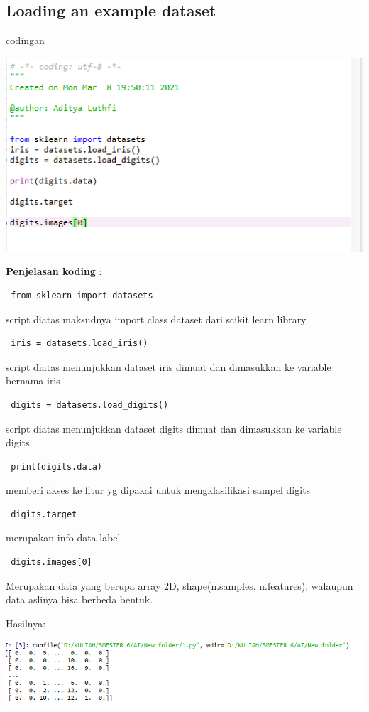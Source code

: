 \documentclass{article}
\begin{document}
    

\subsection{Loading an example dataset}
codingan

\begin{center}
    \includegraphics[width=.8\textwidth]{figures/1184090/chapter1/2.PNG}
\end{center}


\begin{enumerate}
\textbf{Penjelasan koding} :
		
		
		\begin{verbatim} from sklearn import datasets \end{verbatim} script diatas maksudnya import class dataset dari scikit learn library
		
		\begin{verbatim} iris = datasets.load_iris() \end{verbatim} script diatas menunjukkan dataset iris dimuat dan dimasukkan  ke variable bernama iris
		
		\begin{verbatim} digits = datasets.load_digits() \end{verbatim} script diatas menunjukkan  dataset digits dimuat dan dimasukkan ke variable digits
		
		\begin{verbatim} print(digits.data) \end{verbatim} memberi akses ke fitur yg dipakai untuk mengklasifikasi sampel digits 
		
		\begin{verbatim} digits.target  \end{verbatim} merupakan info data label
		
		\begin{verbatim} digits.images[0]  \end{verbatim} Merupakan data yang berupa array 2D, shape(n.samples. n.features), walaupun data aslinya bisa berbeda bentuk.
\end{enumerate}
Hasilnya:
\begin{center}
    \includegraphics[width=.8\textwidth]{figures/1184090/chapter1/3.PNG}
\end{center}
\end{document}
